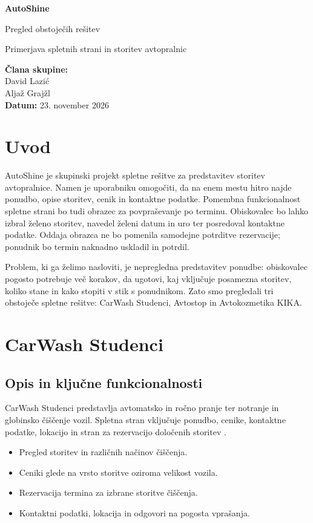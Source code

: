 \documentclass[11pt,a4paper]{article}
\begin{document}
\begin{titlepage}
\centering
\vspace*{3cm}
{\Huge\bfseries AutoShine\par}
\vspace{0.7cm}
{\LARGE Pregled obstoječih rešitev\par}
\vspace{1.5cm}
{\large Primerjava spletnih strani in storitev avtopralnic\par}
\vfill
\begin{flushleft}\large
\textbf{Člana skupine:}\\
David Lazić\\
Aljaž Grajžl\\[0.6cm]
\textbf{Datum:} 23. november 2026
\end{flushleft}
\end{titlepage}
\tableofcontents
\newpage
\section{Uvod}
AutoShine je skupinski projekt spletne rešitve za predstavitev storitev avtopralnice. Namen je uporabniku omogočiti, da na enem mestu hitro najde ponudbo, opise storitev, cenik in kontaktne podatke. Pomembna funkcionalnost spletne strani bo tudi obrazec za povpraševanje po terminu. Obiskovalec bo lahko izbral želeno storitev, navedel želeni datum in uro ter posredoval kontaktne podatke. Oddaja obrazca ne bo pomenila samodejne potrditve rezervacije; ponudnik bo termin naknadno uskladil in potrdil.

Problem, ki ga želimo nasloviti, je nepregledna predstavitev ponudbe: obiskovalec pogosto potrebuje več korakov, da ugotovi, kaj vključuje posamezna storitev, koliko stane in kako stopiti v stik s ponudnikom. Zato smo pregledali tri obstoječe spletne rešitve: CarWash Studenci, Avtostop in Avtokozmetika KIKA.

\section{CarWash Studenci}
\subsection{Opis in ključne funkcionalnosti}
CarWash Studenci predstavlja avtomatsko in ročno pranje ter notranje in globinsko čiščenje vozil. Spletna stran vključuje ponudbo, cenike, kontaktne podatke, lokacijo in stran za rezervacijo določenih storitev \cite{studenci,studenci_rez}.
\begin{itemize}[nosep]
\item Pregled storitev in različnih načinov čiščenja.
\item Ceniki glede na vrsto storitve oziroma velikost vozila.
\item Rezervacija termina za izbrane storitve čiščenja.
\item Kontaktni podatki, lokacija in odgovori na pogosta vprašanja.
\end{itemize}
\end{document}
